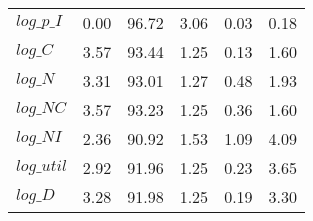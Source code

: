 \begin{center}
\begin{longtable}{lccccc}
$log\_p\_I  $	 & 	        0.00	 & 	       96.72	 & 	        3.06	 & 	        0.03	 & 	        0.18 \\ 
$log\_C     $	 & 	        3.57	 & 	       93.44	 & 	        1.25	 & 	        0.13	 & 	        1.60 \\ 
$log\_N     $	 & 	        3.31	 & 	       93.01	 & 	        1.27	 & 	        0.48	 & 	        1.93 \\ 
$log\_NC    $	 & 	        3.57	 & 	       93.23	 & 	        1.25	 & 	        0.36	 & 	        1.60 \\ 
$log\_NI    $	 & 	        2.36	 & 	       90.92	 & 	        1.53	 & 	        1.09	 & 	        4.09 \\ 
$log\_util  $	 & 	        2.92	 & 	       91.96	 & 	        1.25	 & 	        0.23	 & 	        3.65 \\ 
$log\_D     $	 & 	        3.28	 & 	       91.98	 & 	        1.25	 & 	        0.19	 & 	        3.30 \\ 
\end{longtable}
 \end{center}
